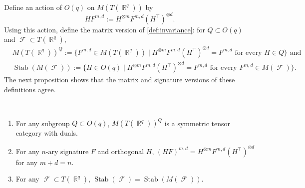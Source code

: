 \documentclass{article}
\DeclareMathOperator{\rr}{\mathbb{R}}
\DeclareMathOperator{\fc}{\mathcal{F}}
\DeclareMathOperator{\stab}{Stab}
\begin{document}
Define an action of $O(q)$ on $M(T(\rr^q))$ by 
\[
    HF^{m,d} := H^{\otimes m} F^{m,d} (H^\top)^{\otimes d}.
\]
Using this action, define the matrix version of \autoref{def:invariance}: for $Q \subset O(q)$ and
$\fc \subset T(\rr^q)$,
\begin{align*}
    &M(T(\rr^q))^Q := \{F^{m,d} \in M(T(\rr^q)) \mid H^{\otimes m} F^{m,d} (H^\top)^{\otimes d} = F^{m,d} \text{ for every } H \in Q\} \text{ and}\\
    &\stab(M(\fc)) := \{H \in O(q) \mid H^{\otimes m}F^{m,d} (H^\top)^{\otimes d} = F^{m,d} \text{ for every } F^{m,d} \in M(\fc)\}. 
\end{align*}
The next proposition shows that the matrix and signature versions of these definitions agree.
\begin{proposition}
    \label{prop:invariant_tcwd}
    ~
    \begin{enumerate}
        \item For any subgroup $Q \subset O(q)$, $M(T(\rr^q))^Q$ is a symmetric tensor category with duals.
        \item For any $n$-ary signature $F$ and orthogonal $H$,
            $(HF)^{m,d} = H^{\otimes m} F^{m,d} (H^\top)^{\otimes d}$ for any $m + d = n$.
        \item For any $\fc \subset T(\rr^q)$, $\stab(\fc) = \stab(M(\fc))$. 
    \end{enumerate}
\end{proposition}
\end{document}
